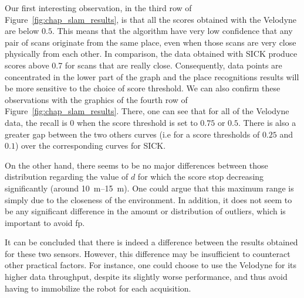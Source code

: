 Our first interesting observation, in the third row of Figure~\ref{fig:chap_slam_results}, is that all the scores obtained with the Velodyne are below $0.5$. This means that the algorithm have very low confidence that any pair of scans originate from the same place, even when those scans are very close physically from each other. In comparison, the data obtained with SICK produce scores above 0.7 for scans that are really close. Consequently, data points are concentrated in the lower part of the graph and the place recognitions results will be more sensitive to the choice of score threshold. We can also confirm these observations with the graphics of the fourth row of Figure~\ref{fig:chap_slam_results}. There, one can see that for all of the Velodyne data, the recall is 0 when the score threshold is set to $0.75$ or $0.5$. There is also a greater gap between the two others curves (i.e for a score thresholds of $0.25$ and $0.1$) over the corresponding curves for SICK.

On the other hand, there seems to be no major differences between those distribution regarding the value of $d$ for which the score stop decreasing significantly (around \SIrange{10}{15}{\meter}). One could argue that this maximum range is simply due to the closeness of the environment. In addition, it does not seem to be any significant difference in the amount or distribution of outliers, which is important to avoid \gls*{fp}.

It can be concluded that there is indeed a difference between the results obtained for these two sensors. However, this difference may be insufficient to counteract other practical factors. For instance, one could choose to use the Velodyne for its higher data throughput, despite its slightly worse performance, and thus avoid having to immobilize the robot for each acquisition.

\FloatBarrier
